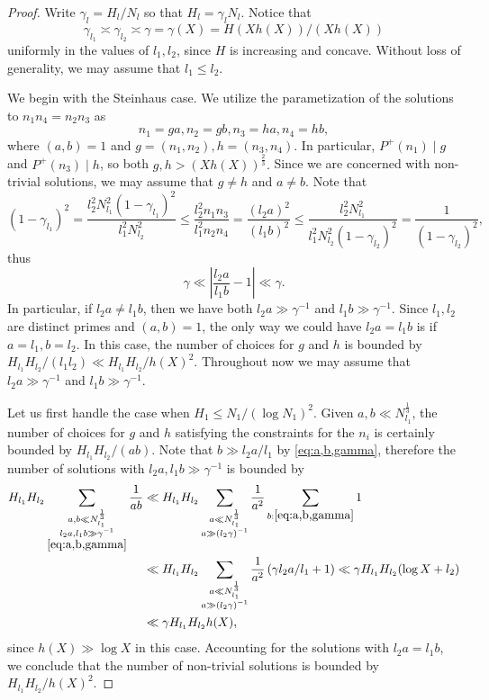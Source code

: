 \documentclass[11pt]{tran-l}
\theoremstyle{definition}
\theoremstyle{remark}
\numberwithin{equation}{section}
\begin{document}
\begin{proof}
Write $\gamma_l = H_l/N_l$ so that $H_l = \gamma_l N_l$. Notice that $$\gamma_{l_1}\asymp \gamma_{l_2}\asymp \gamma = \gamma(X)= H(Xh(X))/(Xh(X))$$ uniformly in the values of $l_1, l_2$, since $H$ is increasing and concave. Without loss of generality, we may assume that $l_1\leq  l_2$. 

We begin with the Steinhaus case. We utilize the parametization of the solutions to $n_1n_4=n_2n_3$ as 
\begin{equation*}
    n_1= ga, n_2 = gb, n_3 =ha, n_4 = hb,
\end{equation*} where $(a, b)=1$ and $g = (n_1, n_2), h=(n_3, n_4).$ In particular, $P^+(n_1)\mid g$ and $P^+(n_3) \mid h$, so both $g, h > (Xh(X))^{\frac{2}{3}}.$ 
Since we are concerned with non-trivial solutions, we may assume that $g\neq h$ and $a\neq b$.  
Note that 
\begin{equation*}
(1-\gamma_{l_1})^2 = \frac{l_2^2N_{l_1}^2(1-\gamma_{l_1})^2}{l_1^2N_{l_2}^2}\leq\frac{l_2^2n_1n_3}{l_1^2n_2n_4} = \frac{(l_2a)^2}{(l_1b)^2}\leq \frac{l_2^2N_{l_1}^2}{l_1^2N_{l_2}^2(1-\gamma_{l_2})^2} = \frac{1}{(1-\gamma_{l_2})^2},
\end{equation*}
thus 
\begin{equation}\label{eq:a,b,gamma}
    \gamma\ll \left\lvert\frac{l_2a}{l_1b} - 1\right\rvert\ll \gamma.
\end{equation} In particular, if $l_2a\neq l_1b$, then we have both $l_2a\gg \gamma^{-1}$ and $l_1b\gg \gamma^{-1}$. Since $l_1, l_2$ are distinct primes and $(a, b) = 1$, the only way we could have $l_2a=l_1b$ is if $a=l_1, b=l_2$. In this case, the number of choices for $g$ and $h$ is bounded by $H_{l_1}H_{l_2}/(l_1l_2)\ll H_{l_1}H_{l_2}/h(X)^2$. Throughout now we may assume that $l_2a\gg \gamma^{-1}$ and $l_1b\gg \gamma^{-1}$. 

Let us first handle the case when $H_1\leq N_1/(\log N_1)^2$. Given $a, b\ll N_{l_1}^{\frac{1}{3}}$, the number of choices for $g$ and $h$ satisfying the constraints for the $n_i$ is certainly bounded by $H_{l_1}H_{l_2}/(ab)$. Note that $b\gg l_2a/l_1$  by \eqref{eq:a,b,gamma}, therefore the number of solutions with $l_2a, l_1b\gg \gamma^{-1}$ is bounded by 
\begin{align*}
H_{l_1}H_{l_2}\sum_{\substack{a, b \ll N_{l_1}^{\frac{1}{3}} \\ l_2a, l_1b\gg \gamma^{-1} \\ \eqref{eq:a,b,gamma}} } \frac{1}{ab} & \ll H_{l_1}H_{l_2} \sum_{\substack{a\ll N_{l_1}^{\frac{1}{3}} \\ a\gg (l_2\gamma)^{-1}}} \frac{1}{a^2}\sum_{b : \eqref{eq:a,b,gamma}}1 
\\ &  \ll H_{l_1}H_{l_2}\sum_{\substack{a\ll N_{l_1}^{\frac{1}{3}} \\ a\gg (l_2\gamma)^{-1}}}  \frac{1}{a^2}\left(\gamma l_2a/l_1 +1 \right)    \ll \gamma H_{l_1}H_{l_2}(\log X + l_2) \\ & \ll \gamma H_{l_1} H_{l_2} h(X),
\end{align*}
since $h(X)\gg \log X$ in this case. Accounting for the solutions with $l_2a=l_1b$, we conclude that the number of non-trivial solutions is bounded by $H_{l_1}H_{l_2}/h(X)^2$. 


\end{proof}
\end{document}
